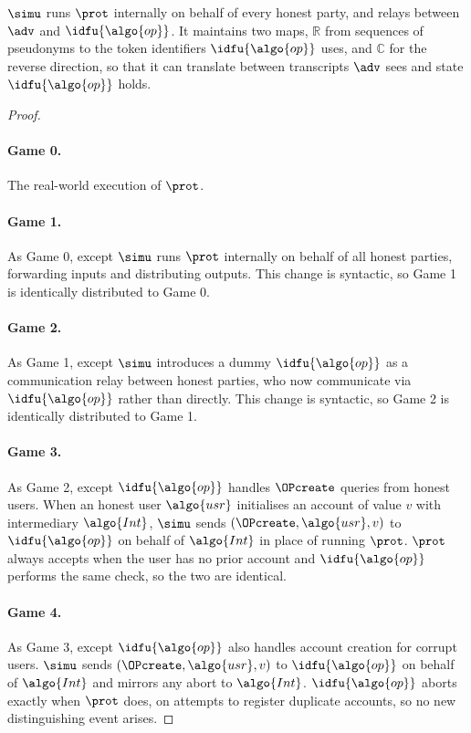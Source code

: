 $\simu$ runs $\prot$ internally on behalf of every honest party, and relays
between $\adv$ and $\idfu{\algo{op}}$. It maintains two maps, $\mathbb{R}$ from
sequences of pseudonyms to the token identifiers $\idfu{\algo{op}}$ uses, and
$\mathbb{C}$ for the reverse direction, so that it can translate between
transcripts $\adv$ sees and state $\idfu{\algo{op}}$ holds.

\begin{proof}

\paragraph{Game 0.} The real-world execution of $\prot$.

\paragraph{Game 1.} As Game 0, except $\simu$ runs $\prot$ internally on
behalf of all honest parties, forwarding inputs and distributing outputs. This
change is syntactic, so Game 1 is identically distributed to Game 0.

\paragraph{Game 2.} As Game 1, except $\simu$ introduces a dummy
$\idfu{\algo{op}}$ as a communication relay between honest parties, who now
communicate via $\idfu{\algo{op}}$ rather than directly. This change is
syntactic, so Game 2 is identically distributed to Game 1.

\paragraph{Game 3.} As Game 2, except $\idfu{\algo{op}}$ handles $\OPcreate$
queries from honest users. When an honest user $\algo{usr}$ initialises an
account of value $v$ with intermediary $\algo{Int}$, $\simu$ sends
$(\OPcreate, \algo{usr}, v)$ to $\idfu{\algo{op}}$ on behalf of $\algo{Int}$ in
place of running $\prot$. $\prot$ always accepts when the user has no prior account
and $\idfu{\algo{op}}$ performs the same check, so the two are identical.

\paragraph{Game 4.} As Game 3, except $\idfu{\algo{op}}$ also handles account
creation for corrupt users. $\simu$ sends $(\OPcreate, \algo{usr}, v)$ to $\idfu{\algo{op}}$
on behalf of $\algo{Int}$ and mirrors any abort to $\algo{Int}$. $\idfu{\algo{op}}$ aborts exactly when $\prot$ does, on
attempts to register duplicate accounts, so no new distinguishing event arises.


\end{proof}
